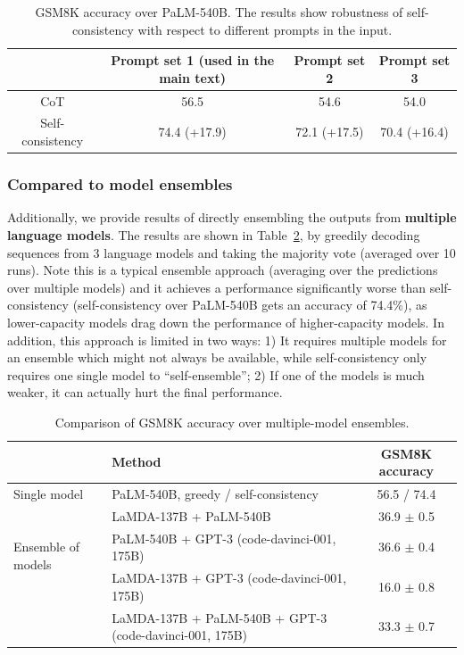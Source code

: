 \begin{table}[h]
\small
    \centering
    \begin{tabular}{c|c|c|c}
    \toprule
    & Prompt set 1 (used in the main text) & Prompt set 2 & Prompt set 3\\
    \midrule
        CoT \citep{wei2022chain} &  56.5 & 54.6 & 54.0 \\
        Self-consistency & 74.4 (+17.9) & 72.1 (+17.5) & 70.4 (+16.4)\\
        \bottomrule
    \end{tabular}
    \vspace{-0.1in}
    \caption{GSM8K accuracy over PaLM-540B. The results show robustness of self-consistency with respect to different prompts in the input.}
    \label{tab:robustness_prompt}
\end{table}


\subsubsection{Compared to model ensembles}
\label{sec:compare_ensemble}
Additionally, we provide results of directly ensembling the outputs from \textbf{multiple language models}. The results are shown in  Table~\ref{tab:ensemble_model}, by greedily decoding sequences from 3 language models and taking the majority vote (averaged over 10 runs). Note this is a typical ensemble approach (averaging over the predictions over multiple models) and it achieves a performance significantly worse than self-consistency (self-consistency over PaLM-540B gets an accuracy of 74.4\%), as lower-capacity models drag down the performance of higher-capacity models. In addition, this approach is limited in two ways:
1) It requires multiple models for an ensemble which might not always be available, while self-consistency only requires one single model to ``self-ensemble'';
2) If one of the models is much weaker, it can actually hurt the final performance.

\begin{table}[h]
\setlength\tabcolsep{3pt}
    \centering
\small
    \begin{tabular}{ll c}
    \toprule
    & Method & GSM8K accuracy\\
     \midrule
Single model & PaLM-540B, greedy / self-consistency & 56.5 / 74.4\\
\midrule
\multirow{3}{*}{Ensemble of models}  &  LaMDA-137B + PaLM-540B & 36.9 $\pm$ 0.5 \\
& PaLM-540B + GPT-3 (code-davinci-001, 175B) &  36.6 $\pm$ 0.4\\
& LaMDA-137B + GPT-3 (code-davinci-001, 175B) &16.0 $\pm$ 0.8\\
& LaMDA-137B + PaLM-540B + GPT-3 (code-davinci-001, 175B) & 33.3 $\pm$ 0.7\\
\bottomrule
    \end{tabular}
    \vspace{-0.1in}
    \caption{Comparison of GSM8K accuracy over multiple-model ensembles.}
    \label{tab:ensemble_model}
\end{table}

